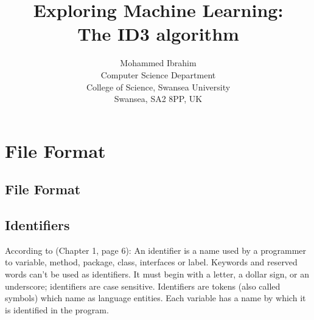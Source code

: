 \documentclass{report}
\begin{document}
\title{Exploring Machine Learning:\\
  The ID3 algorithm}

\author{Mohammed Ibrahim\\
 Computer Science Department\\
  College of Science, Swansea University\\
  Swansea, SA2 8PP, UK
}

\maketitle

\tableofcontents

\chapter{File Format}
\label{sec:fileformat}

\section{File Format}
\label{sec:file}

\section{Identifiers}
\label{sec:ide}

According to \cite{Roberts2000CompleteJava2Certification}(Chapter 1, page 6): An identifier is a name used by a programmer to variable, method, package, class, interfaces or label. Keywords and reserved words can't be used as  identifiers. It must begin with a letter, a dollar sign, or an underscore; identifiers are case sensitive. Identifiers are tokens (also called symbols) which name as language entities. Each variable has a name by which it is identified in the program.







\end{document}
